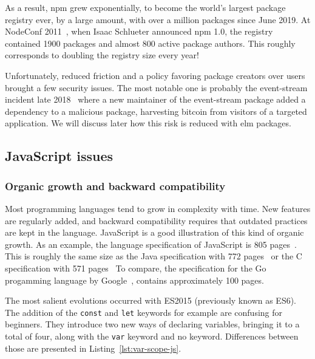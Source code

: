 
As a result, \textsf{npm} grew exponentially, to become the world's largest package
registry ever, by a large amount, with over a million packages since June 2019.
At NodeConf 2011~\cite{npm-video}, when Isaac Schlueter announced \textsf{npm} 1.0,
the registry contained 1900 packages and almost 800 active package authors.
This roughly corresponds to doubling the registry size every year!

Unfortunately, reduced friction and a policy favoring package creators over users
brought a few security issues.
The most notable one is probably the event-stream incident late 2018~\cite{npm-event-stream}
where a new maintainer of the event-stream package added a dependency
to a malicious package, harvesting bitcoin from visitors of a targeted application.
We will discuss later how this risk is reduced with elm packages.


\subsection{JavaScript issues}%
\label{sub:javascript_issues}

\subsubsection{Organic growth and backward compatibility}%
\label{ssub:organic_growth_and_backward_compatibility}

Most programming languages tend to grow in complexity with time.
New features are regularly added, and backward compatibility requires that
outdated practices are kept in the language.
JavaScript is a good illustration of this kind of organic growth.
As an example, the language specification of JavaScript is 805 pages~\cite{ecmascript-pdf}.
This is roughly the same size as the Java specification with 772 pages~\cite{java-spec-pdf}
or the C specification with 571 pages~\cite{c-spec-pdf}
To compare, the specification for the Go progamming language
by Google~\cite{go-spec}, contains approximately 100 pages.


The most salient evolutions occurred with ES2015 (previously known as ES6).
The addition of the \verb|const| and \verb|let| keywords for example are confusing for beginners.
They introduce two new ways of declaring variables, bringing it to a total of four,
along with the \verb|var| keyword and no keyword.
Differences between those are presented in Listing~\ref{lst:var-scope-js}.

